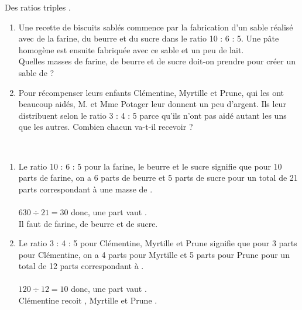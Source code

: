 \begin{exercice*}
   Des ratios \og triples \fg.
      \begin{enumerate}
         \item Une recette de biscuits sablés commence par la fabrication d'un \og sable \fg{} réalisé avec de la farine, du beurre et du sucre dans le ratio 10 : 6 : 5. Une pâte homogène est ensuite fabriquée avec ce sable et un peu de lait. \\
         Quelles masses de farine, de beurre et de sucre doit-on prendre pour créer un \og sable \fg{} de  ?
      \item Pour récompenser leurs enfants Clémentine, Myrtille et Prune, qui les ont beaucoup aidés, M. et Mme Potager leur donnent un peu d'argent. Ils leur distribuent  selon le ratio 3 : 4 : 5 parce qu'ils n'ont pas aidé autant les uns que les autres.
      Combien chacun va-t-il recevoir ?
   \end{enumerate}
\end{exercice*}
\begin{corrige}
\ \\ [-5mm]
   \begin{enumerate}
      \item Le ratio 10 : 6 : 5 pour la farine, le beurre et le sucre signifie que pour 10 parts de farine, on a 6 parts de beurre et 5 parts de sucre pour un total de 21 parts correspondant à une masse de . \\ [2mm]
           \quad  {} \\
         $630\div21 =30$ donc, une part vaut . \\
         Il faut {\color{red}  de farine,  de beurre et  de sucre.}
      \item Le ratio 3 : 4 : 5 pour Clémentine, Myrtille et Prune signifie que pour 3 parts pour Clémentine, on a 4 parts pour Myrtille et 5 parts pour Prune pour un total de 12 parts correspondant à . \\ [2mm]
           \quad  {} \\
         $120\div12 =10$ donc, une part vaut . \\
         {\color{red} Clémentine recoit , Myrtille  et Prune .}
   \end{enumerate}
\end{corrige}
